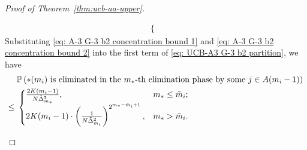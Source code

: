 \documentclass[11pt]{article}
\begin{document}
\begin{proof}[Proof of Theorem~\ref{thm:ucb-aa-upper}]
\begin{itemize}
\begin{align}
\begin{cases}
\end{cases}
\label{eq: A-3 G-3 b2 concentration bound 2}
\end{align}
Substituting \eqref{eq: A-3 G-3 b2 concentration bound 1} and \eqref{eq: A-3 G-3 b2 concentration bound 2} into the first term of \eqref{eq: UCB-A3 G-3 b2 partition}, we have 
\begin{align}
    &\;\mathbb{P}\left(\text{$*(m_i)$ is eliminated in the $m_*$-th elimination phase } \text{by some }j\in A(m_i-1)\right)\notag \\
    \leq & \;\begin{cases}
    \frac{2K(m_i-1)}{N\tilde{\Delta}_{m_*}^2}, & m_* \leq \tilde{m}_i;\\
    2K(m_i-1)\cdot \left(\frac{1}{N\tilde{\Delta}_{\tilde{m}_i}^2}\right)^{2^{m_*-\tilde{m}_i+1}}, & m_*>\tilde{m}_i.
\end{cases}
\label{eq: UCB-A3 G-3 b2 partition term 1}
\end{align}


\end{itemize}
\end{proof}
\end{document}
